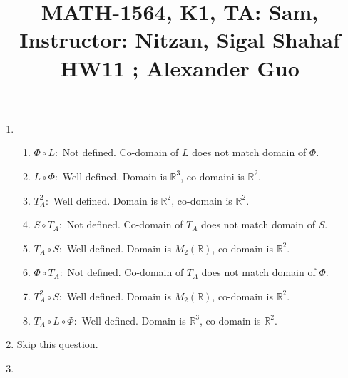 \documentclass{article}
\title{\large{\vspace{-1.0cm}MATH-1564, K1, TA: Sam, Instructor: Nitzan, Sigal Shahaf \\ HW11 ; Alexander Guo}}
\date{}
\begin{document}
\maketitle

\vspace{-1.5cm}

\begin{enumerate}

\item

\begin{enumerate}

\item $\Phi \circ L:$ Not defined. Co-domain of $L$ does not match domain of $\Phi$.

\item $L \circ \Phi:$ Well defined. Domain is $\mathbb{R}^3$, co-domaini is $\mathbb{R}^2$.

\item $T^2_A:$ Well defined. Domain is $\mathbb{R}^2$, co-domain is $\mathbb{R}^2$.

\item $S \circ T_A:$ Not defined. Co-domain of $T_A$ does not match domain of $S$.

\item $T_A \circ S:$ Well defined. Domain is $M_2(\mathbb{R})$, co-domain is $\mathbb{R}^2$.

\item $\Phi \circ T_A:$ Not defined. Co-domain of $T_A$ does not match domain of $\Phi$.

\item $T^2_A \circ S:$ Well defined. Domain is $M_2(\mathbb{R})$, co-domain is $\mathbb{R}^2$.

\item $T_A \circ L \circ \Phi:$ Well defined. Domain is $\mathbb{R}^3$, co-domain is $\mathbb{R}^2$.

\end{enumerate}

\item Skip this question.

\item

\begin{enumerate}


\end{enumerate}
\end{enumerate}
\end{document}
